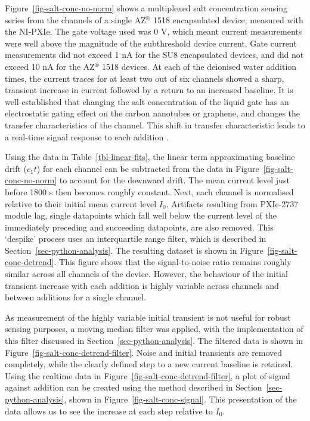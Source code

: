 \documentclass[
  a4paper,
]{scrbook}
\begin{document}
Figure~\ref{fig-salt-conc-no-norm} shows a multiplexed salt
concentration sensing series from the channels of a single
AZ\(^\circledR\) 1518 encapsulated device, measured with the NI-PXIe.
The gate voltage used was 0 V, which meant current measurements were
well above the magnitude of the subthreshold device current. Gate
current measurements did not exceed 1 nA for the SU8 encapsulated
devices, and did not exceed 10 nA for the AZ\(^\circledR\) 1518 devices.
At each of the deionised water addition times, the current traces for at
least two out of six channels showed a sharp, transient increase in
current followed by a return to an increased baseline. It is well
established that changing the salt concentration of the liquid gate has
an electrostatic gating effect on the carbon nanotubes or graphene, and
changes the transfer characteristics of the channel. This shift in
transfer characteristic leads to a real-time signal response to each
addition \autocite{Heller2009,Heller2010,Kireev2017}.

Using the data in Table~\ref{tbl-linear-fits}, the linear term
approximating baseline drift (\(c_1t\)) for each channel can be
subtracted from the data in Figure~\ref{fig-salt-conc-no-norm} to
account for the downward drift. The mean current level just before 1800
s then becomes roughly constant. Next, each channel is normalised
relative to their initial mean current level \(I_{0}\). Artifacts
resulting from PXIe-2737 module lag, single datapoints which fall well
below the current level of the immediately preceding and succeeding
datapoints, are also removed. This `despike' process uses an
interquartile range filter, which is described in
Section~\ref{sec-python-analysis}. The resulting dataset is shown in
Figure~\ref{fig-salt-conc-detrend}. This figure shows that the
signal-to-noise ratio remains roughly similar across all channels of the
device. However, the behaviour of the initial transient increase with
each addition is highly variable across channels and between additions
for a single channel.

As measurement of the highly variable initial transient is not useful
for robust sensing purposes, a moving median filter was applied, with
the implementation of this filter discussed in
Section~\ref{sec-python-analysis}. The filtered data is shown in
Figure~\ref{fig-salt-conc-detrend-filter}. Noise and initial transients
are removed completely, while the clearly defined step to a new current
baseline is retained. Using the realtime data in
Figure~\ref{fig-salt-conc-detrend-filter}, a plot of signal against
addition can be created using the method described in
Section~\ref{sec-python-analysis}, shown in
Figure~\ref{fig-salt-conc-signal}. This presentation of the data allows
us to see the increase at each step relative to \(I_{0}\).
\end{document}
